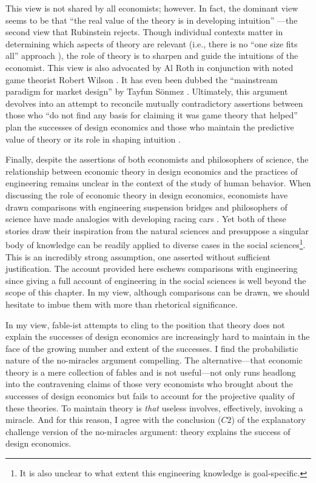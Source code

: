 This view is not shared by all economists; however. In fact, the dominant view seems to be that ``the real value of the theory is in developing intuition'' \autocite[172]{mcafee1996}---the second view that Rubinstein \autocite*{rubinstein2012} rejects. Though individual contexts matter in determining which aspects of theory are relevant (i.e., there is no ``one size fits all'' approach \autocite[C94]{binmore2002}), the role of theory is to sharpen and guide the intuitions of the economist. This view is also advocated by Al Roth in conjunction with noted game theorist Robert Wilson \autocite*{roth2019}. It has even been dubbed the ``mainstream paradigm for market design'' by Tayfun Sönmez \autocite*[10]{sönmez2023minimalist}. Ultimately, this argument devolves into an attempt to reconcile mutually contradictory assertions between those who ``do not find any basis for claiming it was game theory that helped'' \autocite[above]{rubinstein2012} plan the successes of design economics and those who maintain the predictive value of theory or its role in shaping intuition \autocite{roth2019}. 

Finally, despite the assertions of both economists and philosophers of science, the relationship between economic theory in design economics and the practices of engineering remains unclear in the context of the study of human behavior. When discussing the role of economic theory in design economics, economists have drawn comparisons with engineering suspension bridges \autocite{roth2002} and philosophers of science have made analogies with developing racing cars \autocite{alexandrova2009}. Yet both of these stories draw their inspiration from the natural sciences and presuppose a singular body of knowledge can be readily applied to diverse cases in the social sciences\footnote{It is also unclear to what extent this engineering knowledge is goal-specific.}. This is an incredibly strong assumption, one asserted without sufficient justification. The account provided here eschews comparisons with engineering since giving a full account of engineering in the social sciences is well beyond the scope of this chapter. In my view, although comparisons can be drawn, we should hesitate to imbue them with more than rhetorical significance.

In my view, fable-ist attempts to cling to the position that theory does not explain the successes of design economics are increasingly hard to maintain in the face of the growing number and extent of the successes. I find the probabilistic nature of the no-miracles argument compelling. The alternative---that economic theory is a mere collection of fables and is not useful---not only runs headlong into the contravening claims of those very economists who brought about the successes of design economics but fails to account for the projective quality of these theories. To maintain theory is \textit{that} useless involves, effectively, invoking a miracle. And for this reason, I agree with the conclusion ($C2$) of the explanatory challenge version of the no-miracles argument: theory explains the success of design economics.


